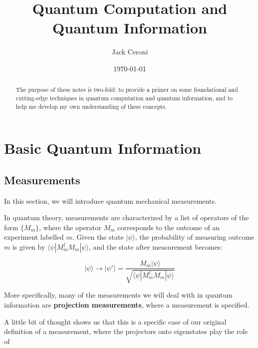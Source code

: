 \documentclass[
 10pt,
 amsmath,amssymb,
 notitlepage,
]{revtex4-1}
\begin{document}
\title{Quantum Computation and Quantum Information}

\author{Jack Ceroni}

\date{\today}

\begin{abstract}
  The purpose of these notes is two-fold: to provide a primer on some foundational and cutting-edge techniques in quantum computation and quantum information, and
  to help me develop my own understanding of these concepts.
\end{abstract}

\maketitle


\tableofcontents

\vspace{.25in}

\newpage

\section{Basic Quantum Information}

\subsection{Measurements}

In this section, we will introduce quantum mechanical measurements.
\newline

In quantum theory, measurements are characterized by a list of operators of the form $\{M_m\}$, where the operator $M_m$ corresponds to the outcome of an experiment labelled $m$. Given the
state $|\psi\rangle$, the probability of measuring outcome $m$ is given by $\langle \psi | M_m^{\dagger} M_m |\psi\rangle$, and the state after measurement becomes:

$$|\psi\rangle \rightarrow |\psi'\rangle = \frac{M_m |\psi\rangle}{\sqrt{\langle \psi | M_m^{\dagger} M_m | \psi \rangle}}$$

More specifically, many of the measurements we will deal with in quantum information are \textbf{projection measurements}, where a measurement is specified.
\newline

A little bit of thought shows us that this is a specific case of our original definition of a measurement, where the projectors onto eigenstates play the role of
\end{document}
